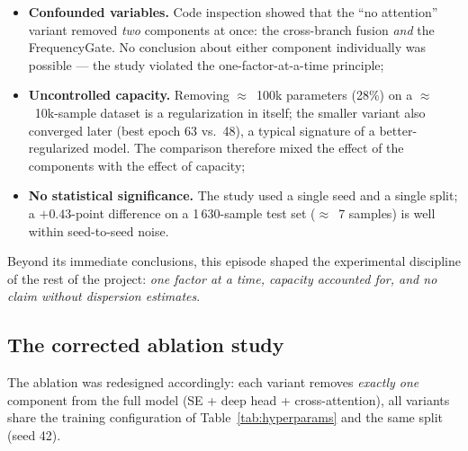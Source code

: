 \begin{itemize}[itemsep=2pt]
    \item \textbf{Confounded variables.} Code inspection showed that the ``no attention'' variant removed \emph{two} components at once: the cross-branch fusion \emph{and} the FrequencyGate. No conclusion about either component individually was possible --- the study violated the one-factor-at-a-time principle;
    \item \textbf{Uncontrolled capacity.} Removing $\approx$~100k parameters (28\%) on a $\approx$~10k-sample dataset is a regularization in itself; the smaller variant also converged later (best epoch 63 vs.\ 48), a typical signature of a better-regularized model. The comparison therefore mixed the effect of the components with the effect of capacity;
    \item \textbf{No statistical significance.} The study used a single seed and a single split; a $+0.43$-point difference on a 1\,630-sample test set ($\approx$~7 samples) is well within seed-to-seed noise.
\end{itemize}

Beyond its immediate conclusions, this episode shaped the experimental discipline of the rest of the project: \emph{one factor at a time, capacity accounted for, and no claim without dispersion estimates}.

\subsection{The corrected ablation study}
\label{sec:ablation-v3}

The ablation was redesigned accordingly: each variant removes \emph{exactly one} component from the full model (SE + deep head + cross-attention), all variants share the training configuration of Table~\ref{tab:hyperparams} and the same split (seed 42).

